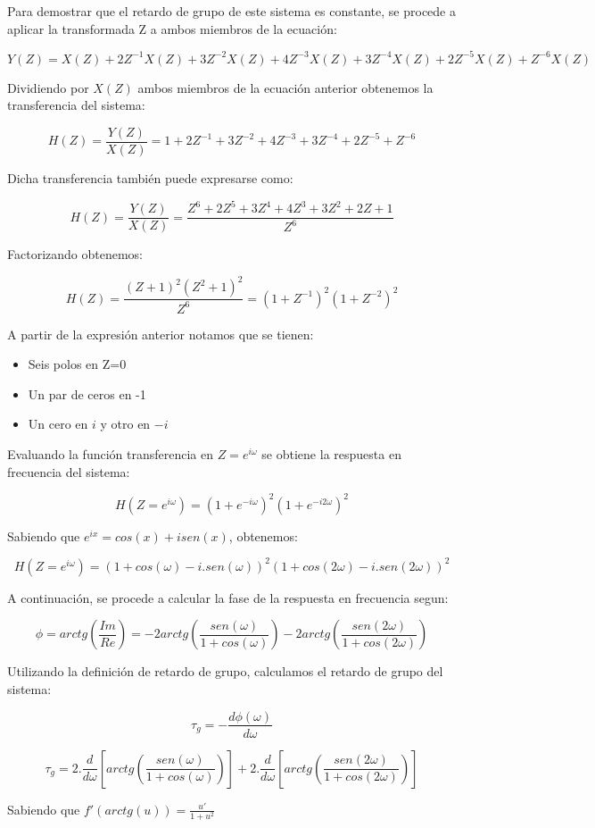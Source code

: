 \documentclass[../../ASSD_TP1_G7.tex]{subfiles}
\begin{document}
  
Para demostrar que el retardo de grupo de este sistema es constante, se procede a aplicar la transformada Z a ambos miembros de la ecuación: 

\[Y(Z)=X(Z)+2Z^{-1} X(Z)+3Z^{-2}X(Z)+4Z^{-3}X(Z)+3Z^{-4}X(Z)+2Z^{-5}X(Z)+Z^{-6}X(Z)\] 

Dividiendo por $X(Z)$ ambos miembros de la ecuación anterior obtenemos la transferencia del sistema:

\[H(Z)=\frac{Y(Z)}{X(Z)}=1+2Z^{-1}+3Z^{-2}+4Z^{-3}+3Z^{-4}+2Z^{-5}+Z^{-6}\] 

Dicha transferencia también puede expresarse como:

\[H(Z)=\frac{Y(Z)}{X(Z)}=\frac{Z^{6}+2Z^{5}+3Z^{4}+4Z^{3}+3Z^{2}+2Z+1}{Z^6}\] 

Factorizando obtenemos:

\[H(Z)=\frac{(Z+1)^2(Z^2+1)^2}{Z^6}=(1+Z^{-1})^2(1+Z^{-2})^2\] 

A partir de la expresión anterior notamos que se tienen:
\begin{itemize}
\item Seis polos en Z=0
\item Un par de ceros en -1 
\item Un cero en $i$ y otro en $-i$
\end{itemize}

Evaluando la función transferencia en $Z=e^{i\omega}$ se obtiene la respuesta en frecuencia del sistema: 

\[H(Z=e^{i\omega})=(1+e^{-i\omega})^2(1+e^{-i2\omega})^2\] 

Sabiendo que $e^{ix}=cos(x)+isen(x)$, obtenemos:

\[H(Z=e^{i\omega})=(1+cos(\omega)-i.sen(\omega))^2(1+cos(2\omega)-i.sen(2\omega))^2\] 

A continuación, se procede a calcular la fase de la respuesta en frecuencia segun:

\[\phi=arctg\left(\frac{Im}{Re}\right)=-2arctg\left(\frac{sen(\omega)}{1+cos(\omega)}\right)-2arctg\left(\frac{sen(2\omega)}{1+cos(2\omega)}\right)\]

Utilizando la definición de retardo de grupo, calculamos el retardo de grupo del sistema:

$$\tau_g = -\frac{d\phi(\omega)}{d\omega}$$


$$\tau_g =2.\frac{d}{d\omega}\left[arctg\left(\frac{sen(\omega)}{1+cos(\omega)}\right)\right]+2.\frac{d}{d\omega}\left[arctg\left(\frac{sen(2\omega)}{1+cos(2\omega)}\right)\right]$$


Sabiendo que $f'(arctg(u))=\frac{u'}{1+u^2}$
\end{document}

